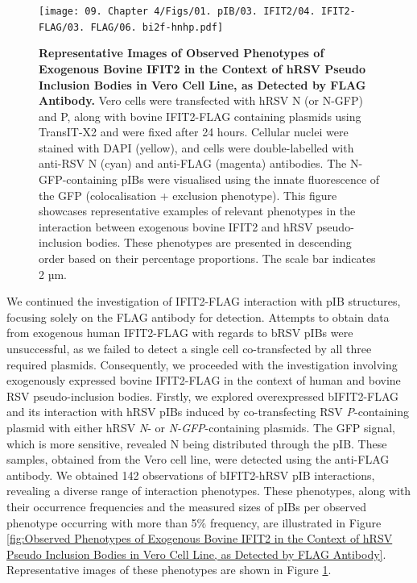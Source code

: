 \begin{figure}
    \centering
    \texttt{[image: 09. Chapter 4/Figs/01. pIB/03. IFIT2/04. IFIT2-FLAG/03. FLAG/06. bi2f-hnhp.pdf]}
    \caption[Representative Images of Observed Phenotypes of Exogenous Bovine IFIT2 in the Context of hRSV Pseudo Inclusion Bodies in Vero Cell Line, as Detected by FLAG Antibody.]{\textbf{Representative Images of Observed Phenotypes of Exogenous Bovine IFIT2 in the Context of hRSV Pseudo Inclusion Bodies in Vero Cell Line, as Detected by FLAG Antibody.} Vero cells were transfected with hRSV N (or N-GFP) and P, along with bovine IFIT2-FLAG containing plasmids using TransIT-X2 and were fixed after 24 hours. Cellular nuclei were stained with DAPI (yellow), and cells were double-labelled with anti-RSV N (cyan) and anti-FLAG (magenta) antibodies. The N-GFP-containing pIBs were visualised using the innate fluorescence of the GFP (colocalisation + exclusion phenotype). This figure showcases representative examples of relevant phenotypes in the interaction between exogenous bovine IFIT2 and hRSV pseudo-inclusion bodies. These phenotypes are presented in descending order based on their percentage proportions. The scale bar indicates 2 µm.}
    \label{fig:Representative Images of Observed Phenotypes of Exogenous Bovine IFIT2 in the Context of hRSV Pseudo Inclusion Bodies in Vero Cell Line, as Detected by FLAG Antibody}
\end{figure}

We continued the investigation of IFIT2-FLAG interaction with pIB structures, focusing solely on the FLAG antibody for detection. Attempts to obtain data from exogenous human IFIT2-FLAG with regards to bRSV pIBs were unsuccessful, as we failed to detect a single cell co-transfected by all three required plasmids. Consequently, we proceeded with the investigation involving exogenously expressed bovine IFIT2-FLAG in the context of human and bovine RSV pseudo-inclusion bodies. Firstly, we explored overexpressed bIFIT2-FLAG and its interaction with hRSV pIBs induced by co-transfecting RSV \textit{P}-containing plasmid with either hRSV \textit{N}- or \textit{N-GFP}-containing plasmids. The GFP signal, which is more sensitive, revealed N being distributed through the pIB. These samples, obtained from the Vero cell line, were detected using the anti-FLAG antibody. We obtained 142 observations of bIFIT2-hRSV pIB interactions, revealing a diverse range of interaction phenotypes. These phenotypes, along with their occurrence frequencies and the measured sizes of pIBs per observed phenotype occurring with more than 5\% frequency, are illustrated in Figure \ref{fig:Observed Phenotypes of Exogenous Bovine IFIT2 in the Context of hRSV Pseudo Inclusion Bodies in Vero Cell Line, as Detected by FLAG Antibody}. Representative images of these phenotypes are shown in Figure \ref{fig:Representative Images of Observed Phenotypes of Exogenous Bovine IFIT2 in the Context of hRSV Pseudo Inclusion Bodies in Vero Cell Line, as Detected by FLAG Antibody}.

